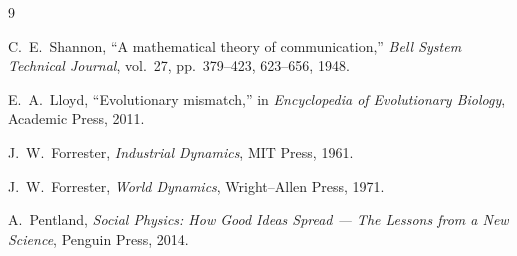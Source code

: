 \documentclass[11pt]{article}
\theoremstyle{plain}
\begin{document}
\begin{thebibliography}{9}

C.~E.~Shannon,
``A mathematical theory of communication,''
\emph{Bell System Technical Journal}, vol.~27, pp.~379--423, 623--656, 1948.

E.~A.~Lloyd,
``Evolutionary mismatch,''
in \emph{Encyclopedia of Evolutionary Biology},
Academic Press, 2011.

J.~W.~Forrester,
\emph{Industrial Dynamics},
MIT Press, 1961.

J.~W.~Forrester,
\emph{World Dynamics},
Wright--Allen Press, 1971.

A.~Pentland,
\emph{Social Physics: How Good Ideas Spread --- The Lessons from a New Science},
Penguin Press, 2014.

\end{thebibliography}
\end{document}
